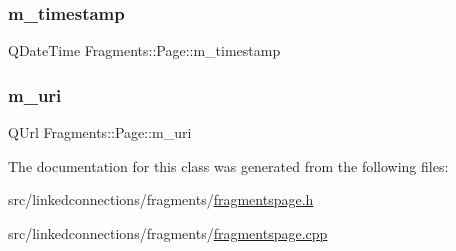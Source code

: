 \subsubsection{\texorpdfstring{m\+\_\+timestamp}{m\_timestamp}}
{\footnotesize\ttfamily Q\+Date\+Time Fragments\+::\+Page\+::m\+\_\+timestamp\hspace{0.3cm}{\ttfamily [private]}}

\mbox{\label{classFragments_1_1Page_ac674951355ab6c5e9c1aa7d8eeb7dbff}} 
\subsubsection{\texorpdfstring{m\+\_\+uri}{m\_uri}}
{\footnotesize\ttfamily Q\+Url Fragments\+::\+Page\+::m\+\_\+uri\hspace{0.3cm}{\ttfamily [private]}}



The documentation for this class was generated from the following files\+:\begin{DoxyCompactItemize}
\item 
src/linkedconnections/fragments/\mbox{\hyperlink{fragmentspage_8h}{fragmentspage.\+h}}\item 
src/linkedconnections/fragments/\mbox{\hyperlink{fragmentspage_8cpp}{fragmentspage.\+cpp}}\end{DoxyCompactItemize}
